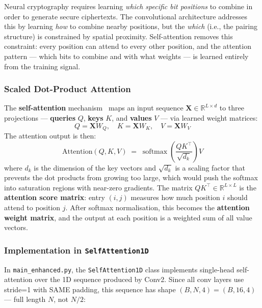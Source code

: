 \documentclass[12pt, a4paper]{article}
\newcommand{\code}[1]{\texttt{\color{CodeRed}#1}}
\begin{document}
Neural cryptography requires learning \emph{which specific bit positions}
to combine in order to generate secure ciphertexts. The convolutional
architecture addresses this by learning \emph{how} to combine nearby
positions, but the \emph{which} (i.e., the pairing structure) is
constrained by spatial proximity. Self-attention removes this constraint:
every position can attend to every other position, and the attention
pattern — which bits to combine and with what weights — is learned
entirely from the training signal.

\subsubsection*{Scaled Dot-Product Attention}

The \textbf{self-attention} mechanism~\cite{vaswani2017attention} maps
an input sequence $\mathbf{X} \in \mathbb{R}^{L \times d}$ to three
projections — \textbf{queries} $Q$, \textbf{keys} $K$, and
\textbf{values} $V$ — via learned weight matrices:
%
\begin{equation}
  Q = \mathbf{X} W_Q, \quad
  K = \mathbf{X} W_K, \quad
  V = \mathbf{X} W_V
  \label{eq:qkv}
\end{equation}
%
The attention output is then:
%
\begin{equation}
  \text{Attention}(Q, K, V)
  \;=\;
  \operatorname{softmax}\!\left(
    \frac{Q K^\top}{\sqrt{d_k}}
  \right) V
  \label{eq:attention}
\end{equation}
%
where $d_k$ is the dimension of the key vectors and $\sqrt{d_k}$ is a
scaling factor that prevents the dot products from growing too large,
which would push the softmax into saturation regions with near-zero
gradients. The matrix $Q K^\top \in \mathbb{R}^{L \times L}$ is the
\textbf{attention score matrix}: entry $(i,j)$ measures how much
position $i$ should attend to position $j$. After softmax normalisation,
this becomes the \textbf{attention weight matrix}, and the output at
each position is a weighted sum of all value vectors.

\subsubsection*{Implementation in \code{SelfAttention1D}}

In \code{main\_enhanced.py}, the \code{SelfAttention1D} class implements
single-head self-attention over the 1D sequence produced by Conv2.
Since all conv layers use stride=1 with SAME padding, this sequence
has shape $(B, N, 4) = (B, 16, 4)$ --- full length $N$, not $N/2$:
\end{document}
